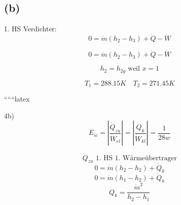 

\subsection*{(b)}

1. HS Verdichter:
\[
0 = \dot{m} (h_2 - h_3) + \dot{Q} - \dot{W}
\]

\[
0 = \dot{m} (h_2 - h_3) + \dot{Q} - \dot{W}
\]

\[
h_2 = h_{2g} \text{ weil } x = 1
\]

\[
T_1 = 288.15K \quad T_2 = 271.45K
\]

``````latex

4b) 
\[
E_{ic} = \left| \frac{\dot{Q}_{zu}}{\dot{W}_{el}} \right| = \left| \frac{\dot{Q}_{k}}{\dot{W}_{kl}} \right| = \frac{1}{28w}
\]

\[
\dot{Q}_{zu} \text{ 1. HS 1. Wärmeübertrager}
\]
\[
0 = \dot{m} (h_2 - h_2) + \dot{Q}_{k}
\]
\[
0 = \dot{m} (h_1 - h_2) + \dot{Q}_{k}
\]
\[
\dot{Q}_{k} = \frac{\dot{m}^2}{h_2 - h_1}
\]